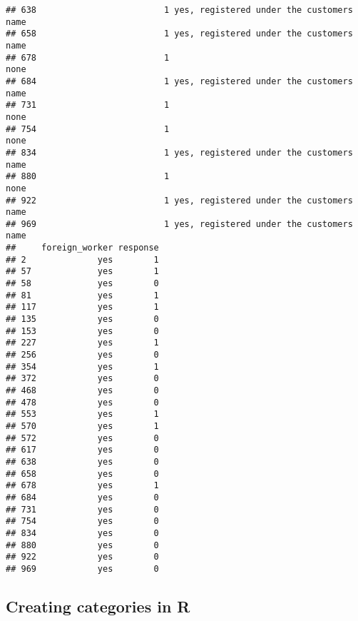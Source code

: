 \documentclass[
]{article}
\newenvironment{Shaded}{\begin{snugshade}}{\end{snugshade}}
\newcommand{\AttributeTok}[1]{\textcolor[rgb]{0.77,0.63,0.00}{#1}}
\newcommand{\DecValTok}[1]{\textcolor[rgb]{0.00,0.00,0.81}{#1}}
\newcommand{\FunctionTok}[1]{\textcolor[rgb]{0.00,0.00,0.00}{#1}}
\newcommand{\NormalTok}[1]{#1}
\newcommand{\OtherTok}[1]{\textcolor[rgb]{0.56,0.35,0.01}{#1}}
\newcommand{\SpecialCharTok}[1]{\textcolor[rgb]{0.00,0.00,0.00}{#1}}
\newcommand{\StringTok}[1]{\textcolor[rgb]{0.31,0.60,0.02}{#1}}
\begin{document}
\begin{verbatim}
## 638                         1 yes, registered under the customers name
## 658                         1 yes, registered under the customers name
## 678                         1                                     none
## 684                         1 yes, registered under the customers name
## 731                         1                                     none
## 754                         1                                     none
## 834                         1 yes, registered under the customers name
## 880                         1                                     none
## 922                         1 yes, registered under the customers name
## 969                         1 yes, registered under the customers name
##     foreign_worker response
## 2              yes        1
## 57             yes        1
## 58             yes        0
## 81             yes        1
## 117            yes        1
## 135            yes        0
## 153            yes        0
## 227            yes        1
## 256            yes        0
## 354            yes        1
## 372            yes        0
## 468            yes        0
## 478            yes        0
## 553            yes        1
## 570            yes        1
## 572            yes        0
## 617            yes        0
## 638            yes        0
## 658            yes        0
## 678            yes        1
## 684            yes        0
## 731            yes        0
## 754            yes        0
## 834            yes        0
## 880            yes        0
## 922            yes        0
## 969            yes        0
\end{verbatim}

\hypertarget{creating-categories-in-r}{%
\subsection{Creating categories in R}\label{creating-categories-in-r}}

\begin{Shaded}
\end{Shaded}
\end{document}
